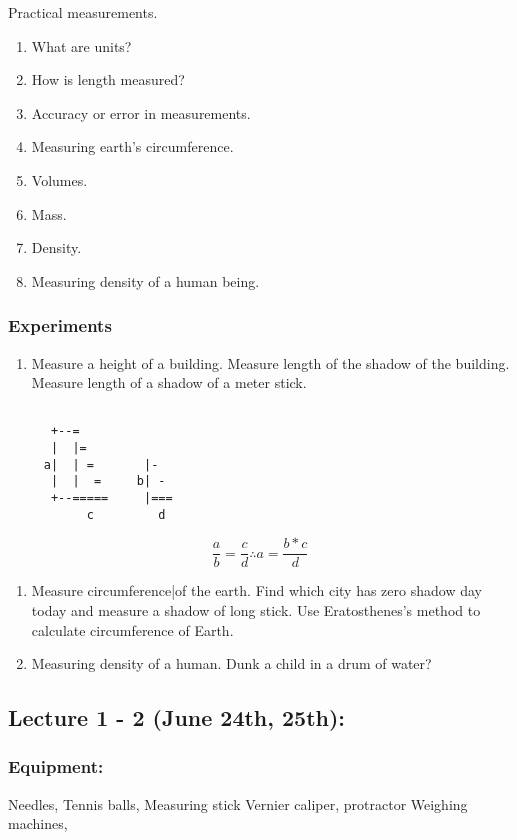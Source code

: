 \documentclass[11pt]{article}
\begin{document}
Practical measurements.


\begin{enumerate}
\item What are units?
\item How is length measured?
\item Accuracy or error in measurements.
\item Measuring earth's circumference.
\item Volumes.
\item Mass.
\item Density.
\item Measuring density of a human being.
\end{enumerate}

\subsubsection{Experiments}
\label{sec:orgfa761dc}
\begin{enumerate}
\item Measure a height of a building.
Measure length of the shadow of the building.
Measure length of a shadow of a meter stick.
\end{enumerate}
\begin{verbatim}

      +--=
      |  |=
     a|  | =       |-
      |  |  =     b| -
      +--=====     |===
           c         d

\end{verbatim}
\[
   \frac{a}{b} = \frac{c}{d} \therefore a = \frac{b * c}{d}
   \]

\begin{enumerate}
\item Measure circumference|of the earth.
Find which city has zero shadow day today and measure a shadow of long stick.
Use Eratosthenes's method to calculate circumference of Earth.

\item Measuring density of a human.
Dunk a child in a drum of water?
\end{enumerate}




\subsection{Lecture 1 - 2 (June 24th, 25th):}
\label{sec:orgb90026a}
\subsubsection{Equipment:}
\label{sec:org095f7a4}
Needles, Tennis balls, Measuring stick
Vernier caliper, protractor
Weighing machines,
\end{document}
